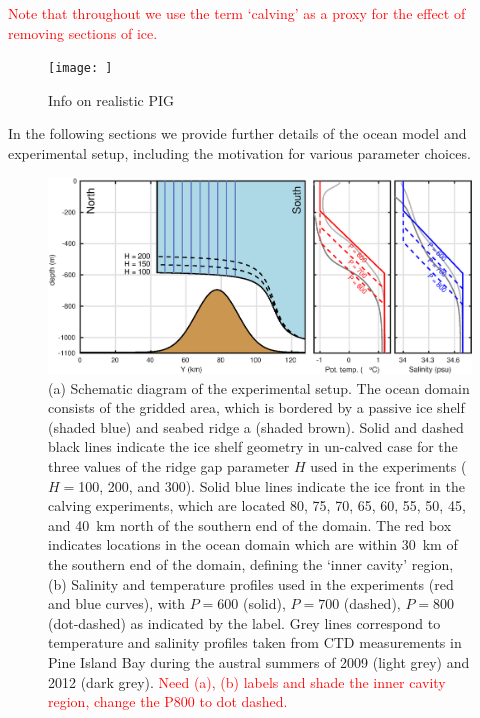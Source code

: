 \documentclass[draft]{agujournal2019}
\newcommand{\red}[1]{\textcolor{red}{#1}}
\begin{document}
\red{Note that throughout we use the term `calving' as a proxy for the effect of removing sections of ice.}

\begin{figure}
    \centering
    \texttt{[image: ]}
    \caption{Info on realistic PIG}
    \label{fig:figure1}
\end{figure}

In the following sections we provide further details of the ocean model and experimental setup, including the motivation for various parameter choices.

\begin{figure}
    \centering
    \includegraphics[width = \textwidth]{../make_figures/plots/figure2.eps}
    \caption{(a) Schematic diagram of the experimental setup. The ocean domain consists of the gridded area, which is bordered by a passive ice shelf (shaded blue) and seabed ridge a (shaded brown). Solid and dashed black lines indicate the ice shelf geometry in un-calved case for the three values of the ridge gap parameter $H$ used in the experiments ($H = $100, 200, and 300). Solid blue lines indicate the ice front in the calving experiments, which are located 80, 75, 70, 65, 60, 55, 50, 45, and 40~km north of the southern end of the domain. The red box indicates locations in the ocean domain which are within 30~km of the southern end of the domain, defining the `inner cavity' region, (b) Salinity and temperature profiles used in the experiments (red and blue curves), with $P = 600$ (solid), $P = 700$ (dashed), $P = 800$ (dot-dashed) as indicated by the label. Grey lines correspond to temperature and salinity profiles taken from CTD measurements in Pine Island Bay during the austral summers of 2009 (light grey) and 2012 (dark grey).  \red{Need (a), (b) labels and shade the inner cavity region, change the P800 to dot dashed.} }
    \label{fig:Schematic}
\end{figure}
\end{document}
